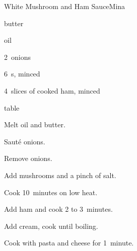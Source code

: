 \begin{recipe}{White Mushroom and Ham Sauce}{Mina}{}

\begin{ingredients}
\item \C{\quarter} butter
\item \C{\half} oil
\item 2~onions
\item 6~s, minced
\item 4~slices of cooked ham, minced
\item {} table 
\item {}
\end{ingredients}

\begin{directions}
\item Melt oil and butter.
\item Saut\'e onions.
\item Remove onions.
\item Add mushrooms and a pinch of salt.
\item Cook 10~minutes on low heat.
\item Add ham and cook 2 to 3~minutes.
\item Add cream, cook until boiling.
\item Cook with pasta and cheese for 1~minute.
\end{directions}

\end{recipe}

